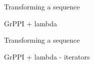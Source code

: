 %
%
%
%

\begin{frame}[t,fragile]{Transforming a sequence}
\begin{block}{GrPPI + lambda}

\end{block}
\end{frame}

\begin{frame}[t,fragile]{Transforming a sequence}
\begin{block}{GrPPI + lambda - iterators}

\end{block}
\end{frame}

